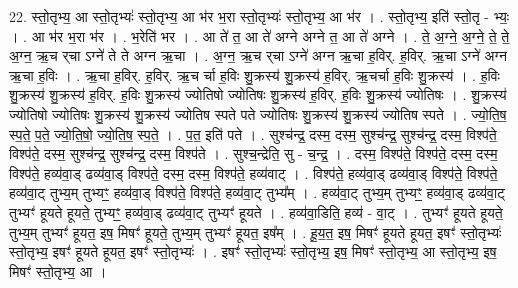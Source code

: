 \documentclass[17pt]{extarticle}
\begin{document}
22. स्तो॒तृभ्य॒ आ स्तो॒तृभ्यः॑ स्तो॒तृभ्य॒ आ भ॑र भ॒रा स्तो॒तृभ्यः॑ स्तो॒तृभ्य॒ आ भ॑र । . स्तो॒तृभ्य॒ इति॑ स्तो॒तृ - भ्यः॒ । . आ भ॑र भ॒रा भ॑र । . भ॒रेति॑ भर । . आ ते॑ त॒ आ ते॑ अग्ने अग्ने त॒ आ ते॑ अग्ने । . ते॒ अ॒ग्ने॒ अ॒ग्ने॒ ते॒ ते॒ अ॒ग्न॒ ऋ॒च र्‌चा ऽग्ने॑ ते ते अग्न ऋ॒चा । . अ॒ग्न॒ ऋ॒च र्‌चा ऽग्ने॑ अग्न ऋ॒चा ह॒विर्. ह॒विर्. ऋ॒चा ऽग्ने॑ अग्न ऋ॒चा ह॒विः । . ऋ॒चा ह॒विर्. ह॒विर्. ऋ॒च र्चा ह॒विः शु॒क्रस्य॑ शु॒क्रस्य॑ ह॒विर्. ऋ॒चर्चा ह॒विः शु॒क्रस्य॑ । . ह॒विः शु॒क्रस्य॑ शु॒क्रस्य॑ ह॒विर्. ह॒विः शु॒क्रस्य॑ ज्योतिषो ज्योतिषः शु॒क्रस्य॑ ह॒विर्. ह॒विः शु॒क्रस्य॑ ज्योतिषः । . शु॒क्रस्य॑ ज्योतिषो ज्योतिषः शु॒क्रस्य॑ शु॒क्रस्य॑ ज्योतिष स्पते पते ज्योतिषः शु॒क्रस्य॑ शु॒क्रस्य॑ ज्योतिष स्पते । . ज्यो॒ति॒ष॒ स्प॒ते॒ प॒ते॒ ज्यो॒ति॒षो॒ ज्यो॒ति॒ष॒ स्प॒ते॒ । . प॒त॒ इति॑ पते । . सुश्च॑न्द्र॒ दस्म॒ दस्म॒ सुश्च॑न्द्र॒ सुश्च॑न्द्र॒ दस्म॒ विश्प॑ते॒ विश्प॑ते॒ दस्म॒ सुश्च॑न्द्र॒ सुश्च॑न्द्र॒ दस्म॒ विश्प॑ते । . सुश्च॒न्द्रेति॒ सु - च॒न्द्र॒ । . दस्म॒ विश्प॑ते॒ विश्प॑ते॒ दस्म॒ दस्म॒ विश्प॑ते॒ हव्य॑वा॒ड् ढव्य॑वा॒ड् विश्प॑ते॒ दस्म॒ दस्म॒ विश्प॑ते॒ हव्य॑वाट् । . विश्प॑ते॒ हव्य॑वा॒ड् ढव्य॑वा॒ड् विश्प॑ते॒ विश्प॑ते॒ हव्य॑वा॒ट् तुभ्य॒म् तुभ्यꣳ॒॒ हव्य॑वा॒ड् विश्प॑ते॒ विश्प॑ते॒ हव्य॑वा॒ट् तुभ्य᳚म् । . हव्य॑वा॒ट् तुभ्य॒म् तुभ्यꣳ॒॒ हव्य॑वा॒ड् ढव्य॑वा॒ट् तुभ्यꣳ॑ हूयते हूयते॒ तुभ्यꣳ॒॒ हव्य॑वा॒ड् ढव्य॑वा॒ट् तुभ्यꣳ॑ हूयते । . हव्य॑वा॒डिति॒ हव्य॑ - वा॒ट् । . तुभ्यꣳ॑ हूयते हूयते॒ तुभ्य॒म् तुभ्यꣳ॑ हूयत॒ इष॒ मिषꣳ॑ हूयते॒ तुभ्य॒म् तुभ्यꣳ॑ हूयत॒ इष᳚म् । . हू॒य॒त॒ इष॒ मिषꣳ॑ हूयते हूयत॒ इषꣳ॑ स्तो॒तृभ्यः॑ स्तो॒तृभ्य॒ इषꣳ॑ हूयते हूयत॒ इषꣳ॑ स्तो॒तृभ्यः॑ । . इषꣳ॑ स्तो॒तृभ्यः॑ स्तो॒तृभ्य॒ इष॒ मिषꣳ॑ स्तो॒तृभ्य॒ आ स्तो॒तृभ्य॒ इष॒ मिषꣳ॑ स्तो॒तृभ्य॒ आ । \newline
\end{document}
